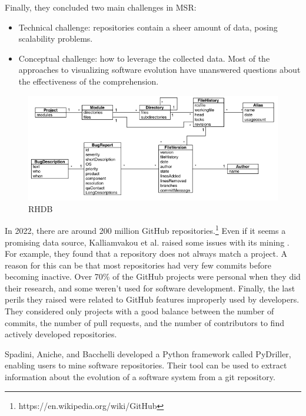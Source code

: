 Finally, they concluded two main challenges in MSR:
\begin{itemize}
  \item Technical challenge: repositories contain a sheer amount of data, posing scalability problems. 
  \item Conceptual challenge: how to leverage the collected data. 
  Most of the approaches to visualizing software evolution have unanswered questions about the effectiveness of the comprehension. 
\end{itemize}

\begin{figure}[H]
\centering
  \includegraphics[width=0.9\linewidth]{RHDB.png} 
  \caption{RHDB}
  \label{fig:RHDB}
\end{figure}
 


In 2022, there are around 200 million GitHub repositories.\footnote{https://en.wikipedia.org/wiki/GitHub}
Even if it seems a promising data source, Kalliamvakou et al. raised some issues with its mining \cite{Kalliamvakou2014}.
For example, they found that a repository does not always match a project. 
A reason for this can be that most repositories had very few commits before becoming inactive.
Over 70\% of the GitHub projects were personal when they did their research, and some weren't used for software development. 
Finally, the last perils they raised were related to GitHub features improperly used by developers.
They considered only projects with a good balance between the number of commits, 
the number of pull requests, and the number of contributors to find actively developed repositories. 
 

Spadini, Aniche, and Bacchelli \cite{Spadini2018} developed a Python framework called PyDriller, enabling users to mine software repositories. 
Their tool can be used to extract information about the evolution of a software system from a git repository.  

